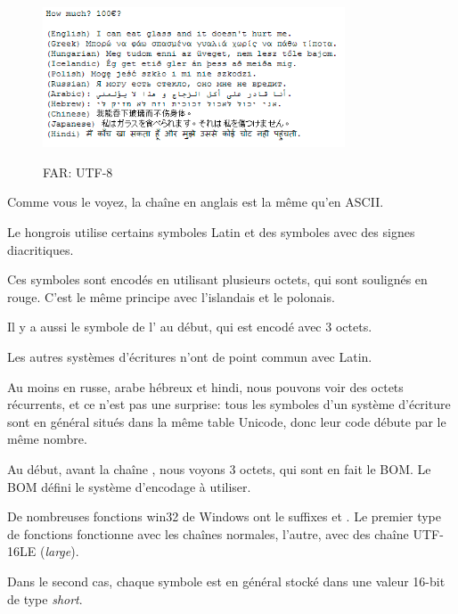 \begin{figure}[H]
\centering
\includegraphics[width=0.8\textwidth]{digging_into_code/strings/multilang_sampler.png}
\end{figure}

\begin{figure}[H]
\centering
{}
\caption{FAR: UTF-8}
\end{figure}

Comme vous le voyez, la chaîne en anglais est la même qu'en ASCII.

Le hongrois utilise certains symboles Latin et des symboles avec des signes diacritiques.

Ces symboles sont encodés en utilisant plusieurs octets, qui sont soulignés en rouge.
C'est le même principe avec l'islandais et le polonais.

Il y a aussi le symbole de l' au début, qui est encodé avec 3 octets.

Les autres systèmes d'écritures n'ont de point commun avec Latin.

Au moins en russe, arabe hébreux et hindi, nous pouvons voir des octets récurrents,
et ce n'est pas une surprise: tous les symboles d'un système d'écriture sont en général
situés dans la même table Unicode, donc leur code débute par le même nombre.

Au début, avant la chaîne , nous voyons 3 octets, qui sont en fait le
\ac{BOM}. Le \ac{BOM} défini le système d'encodage à utiliser.


De nombreuses fonctions win32 de Windows ont le suffixes  et .
Le premier type de fonctions fonctionne avec les chaînes normales, l'autre, avec
des chaîne UTF-16LE (\emph{large}).

Dans le second cas, chaque symbole est en général stocké dans une valeur 16-bit de
type \emph{short}.

